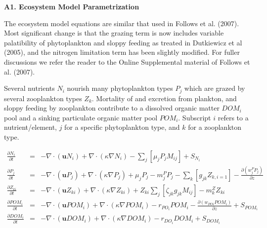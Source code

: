 \documentclass[11pt,letterpaper,english]{article}
\begin{document}
\newcommand{\etal}{{\em et al.}}
\newcommand{\ux}{{\underline{x}}}
\newcommand{\tdt}{{t}}


{\bf {\large A1. Ecosystem Model Parametrization}}

The ecosystem model equations are similar that used in Follows et al. (2007).
Most significant change is that the grazing term is now includes variable
palatibility of phytoplankton and sloppy feeding as treated in Dutkiewicz et al
(2005), and the nitrogen limitation term has been slightly modified.  For
fuller discussions we refer the reader to the Online Supplemental material of
Follows et al. (2007).

Several nutrients $N_i$ nourish many phytoplankton types $P_j$ which are grazed
by several zooplankton types $Z_k$. Mortality of and excretion from plankton,
and sloppy feeding by zooplankton contribute to a dissolved organic matter
$DOM_i$ pool and a sinking particulate organic matter pool $POM_i$.  Subscript
$i$ refers to a nutrient/element, $j$ for a specific phytoplankton type, and
$k$ for a zooplankton type.

\begin{eqnarray}
\frac{\partial N_i}{\partial t} & = & 
-\nabla \cdot (\textbf{u} N_i) +\nabla \cdot (\kappa\nabla N_i)-
\sum_j [\mu_j P_j M_{ij}]+S_{N_i}
\nonumber  \\
\frac{\partial P_j}{\partial t} & = & 
-\nabla \cdot (\textbf{u} P_j) + \nabla \cdot (\kappa\nabla P_j)+
\mu_j P_j - m_j^P P_j-\sum_k [g_{jk} Z_{k,i=1}]
-\frac{\partial(w_j^P P_j)}{\partial z}
\nonumber \\
\frac{\partial Z_{ki}}{\partial t} & = & 
- \nabla \cdot (\textbf{u} Z_{ki}) + \nabla \cdot (\kappa\nabla Z_{ki})
+Z_{ki}\sum_j [\zeta_{jk} g_{jk} M_{ij}] -m_k^Z Z_{ki}
\nonumber \\
\frac{\partial POM_i}{\partial t} & = & 
-\nabla \cdot (\textbf{u} POM_i) + \nabla \cdot (\kappa\nabla POM_i)-
r_{PO_i}POM_i-\frac{\partial(w_{POi} POM_i)}{\partial z}+S_{POM_i}
\nonumber \\
\frac{\partial DOM_i}{\partial t} & = & 
-\nabla \cdot (\textbf{u} DOM_i) + \nabla \cdot (\kappa\nabla DOM_i)- 
r_{DO_i}DOM_i + S_{DOM_i} 
\nonumber
\end{eqnarray}
\end{document}
